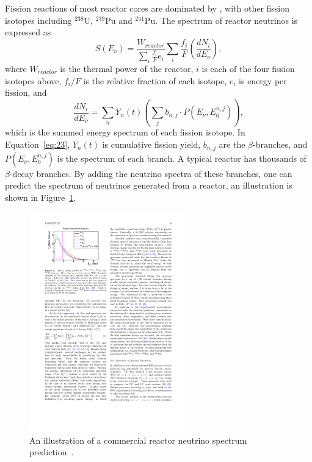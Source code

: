    	Fission reactions of most reactor cores are dominated by \Ulow , with other fission isotopes including $^{238}$U, $^{239}$Pu and $^{241}$Pu.
    The spectrum of reactor neutrinos is expressed as
    \begin{equation}\label{eq2.2}
        S(E_\nu) = \frac{W_{reactor}}{\sum_i \frac{f_i}{F}e_i}\sum_i\frac{f_i}{F}(\frac{dN_i}{dE_\nu}),
    \end{equation}
    where $W_{reactor}$ is the thermal power of the reactor, $i$ is each of the four fission isotopes above, $f_i/F$ is the relative fraction of each isotope, $e_i$ is energy per fission, and 
    \begin{equation}
        \frac{dN_i}{dE_\nu} = \sum_n Y_n(t)(\sum_j b_{n,j}\cdot P(E_\nu, E_0^{n,j})),
        \label{eq:23}
    \end{equation}
    which is the summed energy spectrum of each fission isotope.
    In Equation~\ref{eq:23}, $Y_n(t)$ is cumulative fission yield, $b_{n,j}$ are the $\beta$-branches, and $P(E_\nu, E_0^{n,j})$ is the spectrum of each branch.
    A typical reactor has thousands of $\beta$-decay branches. 
    By adding the neutrino spectra of these branches, one can predict the spectrum of neutrinos generated from a reactor, an illustration is shown in Figure~\ref{fig:2.1}.
    \begin{figure}[h!]\label{fig:2.1}
    \centering
    \includegraphics[width=0.6\textwidth]{Figures/RxNeutrinoSpec.pdf}
    \caption[Predicted reactor neutrino spectrum]{An illustration of a commercial reactor neutrino spectrum prediction~\cite{bib:Qian2019}.}
    \end{figure}  


